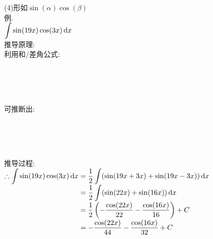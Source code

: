 (4)形如$\sin(\alpha)\cos(\beta)$\\
例.\\
$\displaystyle\int\sin(19x)\cos(3x)\mathop{}\!\mathrm{d} x$\\
推导原理:\\
利用和/差角公式:\\[-4ex]
\begin{center}
    \\[2ex]
    \\[2ex]
    \\[2ex]
\end{center}\vspace{1ex}
可推断出:\\[-4ex]
\begin{center}
	\\[2ex]
	\\[2ex]
	\\[2ex]
\end{center}\newpage
推导过程:\\
$\displaystyle\therefore\int\sin(19x)\cos(3x)\mathop{}\!\mathrm{d} x=\frac{1}{2}\int(\sin(19x+3x)+\sin(19x-3x))\mathop{}\!\mathrm{d} x$\\
$\displaystyle\phantom{\therefore\int\sin(19x)\cos(3x)\dif x}=\frac{1}{2}\int(\sin(22x)+\sin(16x))\dif x$\\
$\displaystyle\phantom{\therefore\int\sin(19x)\cos(3x)\dif x}=\frac{1}{2}\left(-\frac{\cos(22x)}{22}-\frac{\cos(16x)}{16}\right)+C$\\
$\displaystyle\phantom{\therefore\int\sin(19x)\cos(3x)\dif x}=-\frac{\cos(22x)}{44}-\frac{\cos(16x)}{32}+C$\\[4ex]

